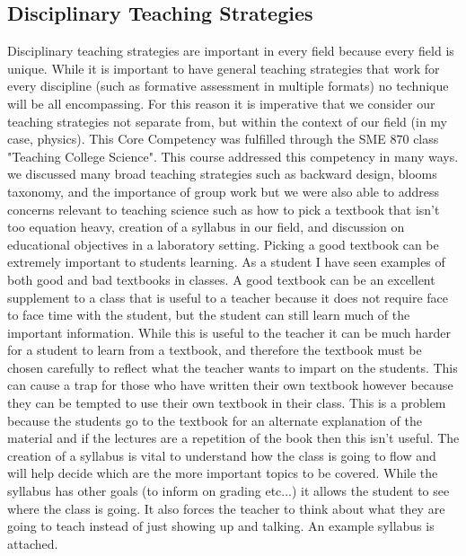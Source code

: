 \documentclass{article}
\begin{document}
\subsection{Disciplinary Teaching Strategies}
\hspace{0.5cm}Disciplinary teaching strategies are important in every field because every field is unique. While it is important to have general teaching strategies that work for every discipline (such as formative assessment in multiple formats) no technique will be all encompassing. For this reason it is imperative that we consider our teaching strategies not separate from, but within the context of our field (in my case, physics). 
This Core Competency was fulfilled through the SME 870 class "Teaching College Science". This course addressed this competency in many ways. we discussed many broad teaching strategies such as backward design, blooms taxonomy, and the importance of group work but we were also able to address concerns relevant to teaching science such as how to pick a textbook that isn't too equation heavy, creation of a syllabus in our field, and discussion on educational objectives in a laboratory setting. 
Picking a good textbook can be extremely important to students learning. As a student I have seen examples of both good and bad textbooks in classes. A good textbook can be an excellent supplement to a class that is useful to a teacher because it does not require face to face time with the student, but the student can still learn much of the important information. While this is useful to the teacher it can be much harder for a student to learn from a textbook, and therefore the textbook must be chosen carefully to reflect what the teacher wants to impart on the students. This can cause a trap for those who have written their own textbook however because they can be tempted to use their own textbook in their class. This is a problem because the students go to the textbook for an alternate explanation of the material and if the lectures are a repetition of the book then this isn't useful. 
The creation of a syllabus is vital to understand how the class is going to flow and will help decide which are the more important topics to be covered. While the syllabus has other goals (to inform on grading etc...) it allows the student to see where the class is going. It also forces the teacher to think about what they are going to teach instead of just showing up and talking. An example syllabus is attached.
\end{document}
